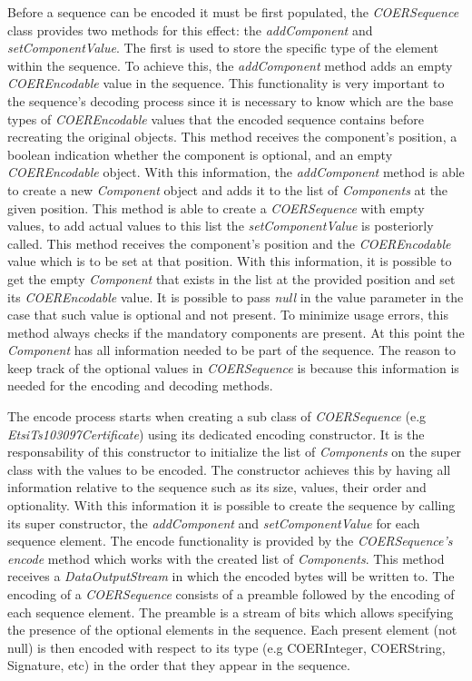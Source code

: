Before a sequence can be encoded it must be first populated, the \textit{COERSequence} class provides two methods for this effect: the \textit{addComponent} and \textit{setComponentValue}. The first is used to store the specific type of the element within the sequence. To achieve this, the \textit{addComponent} method adds an empty \textit{COEREncodable} value in the sequence. This functionality is very important to the sequence's decoding process since it is necessary to know which are the base types of \textit{COEREncodable} values that the encoded sequence contains before recreating the original objects. This method receives the component's position, a boolean indication whether the component is optional, and an empty \textit{COEREncodable} object. With this information, the \textit{addComponent} method is able to create a new \textit{Component} object and adds it to the list of \textit{Components} at the given position. This method is able to create a \textit{COERSequence} with empty values, to add actual values to this list the \textit{setComponentValue} is posteriorly called. This method receives the component's position and the \textit{COEREncodable} value which is to be set at that position. With this information, it is possible to get the empty \textit{Component} that exists in the list at the provided position and set its \textit{COEREncodable} value. It is possible to pass \textit{null} in the value parameter in the case that such value is optional and not present. To minimize usage errors, this method always checks if the mandatory components are present. At this point the \textit{Component} has all information needed to be part of the sequence. The reason to keep track of the optional values in \textit{COERSequence} is because this information is needed for the encoding and decoding methods. 


The encode process starts when creating a sub class of \textit{COERSequence} (e.g \textit{EtsiTs103097Certificate}) using its dedicated encoding constructor. It is the responsability of this constructor to initialize the list of \textit{Components} on the super class with the values to be encoded. The constructor achieves this by having all information relative to the sequence such as its size, values, their order and optionality. With this information it is possible to create the sequence by calling its super constructor, the \textit{addComponent} and \textit{setComponentValue} for each sequence element. The encode functionality is provided by the \textit{COERSequence's} \textit{encode} method which works with the created list of \textit{Components}. This method receives a \textit{DataOutputStream} in which the encoded bytes will be written to. The encoding of a \textit{COERSequence} consists of a preamble followed by the encoding of each sequence element. The preamble is a stream of bits which allows specifying the presence of the optional elements in the sequence. Each present element (not null) is then encoded with respect to its type (e.g COERInteger, COERString, Signature, etc) in the order that they appear in the sequence. 


